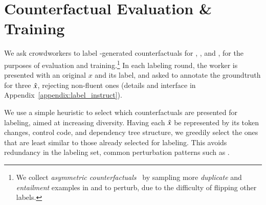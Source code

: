 \section{Counterfactual Evaluation \& Training}
\label{sec:app_label}

We ask crowdworkers to label \sysname-generated counterfactuals for \sst, \nli, and \qqp, for the purposes of evaluation and training.\footnote{We collect \emph{asymmetric counterfactuals}~\cite{garg2019counterfactual} by sampling more \emph{duplicate} and \emph{entailment} examples in \qqp and \nli to perturb, due to the difficulty of flipping other labels.} 
In each labeling round, the worker is presented with an original $x$ and its label, and asked to annotate the groundtruth for three $\hat{x}$, rejecting non-fluent ones (details and interface in Appendix~\ref{appendix:label_instruct}).

We use a simple heuristic to select which counterfactuals are presented for labeling, aimed at increasing diversity. 
Having each $\hat{x}$ be represented by its token changes, control code, and dependency tree structure, we greedily select the ones that are least similar to those already selected for labeling. 
This avoids redundancy in the labeling set, \eg common perturbation patterns such as .


